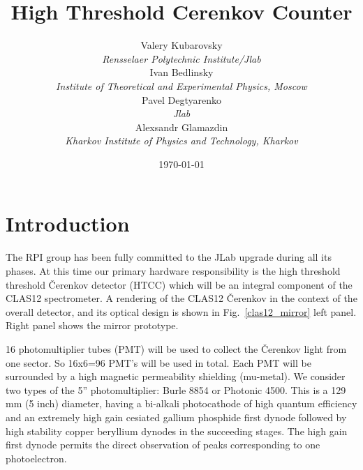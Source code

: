 \documentclass[11pt,titlepage]{article}
\begin{document}
\title{\textsf{High Threshold Cerenkov Counter}}
\author{Valery Kubarovsky\\
{\it \small Rensselaer Polytechnic Institute/Jlab}\\
Ivan Bedlinsky\\
{\it \small Institute of Theoretical and Experimental Physics, Moscow}\\
Pavel Degtyarenko\\
{\it \small Jlab}\\
Alexsandr Glamazdin\\
{\it \small Kharkov Institute of Physics and Technology, Kharkov}}
\date{\today }
\maketitle
\clearpage

\section{Introduction}

 The RPI group has been  fully 
committed to the JLab upgrade during  all its phases. At this time our primary hardware 
responsibility is the high threshold threshold \v Cerenkov detector (HTCC) which will 
be an integral component of the CLAS12 spectrometer. A rendering of the CLAS12 \v Cerenkov  
in the context of the overall detector, and its optical design  is shown in Fig.~\ref{clas12_mirror}
left panel.
Right panel shows the mirror prototype.

16 photomultiplier tubes (PMT) will be used to collect the \v Cerenkov light from one sector.
So  16x6=96 PMT's will be used in total.
Each PMT will be  surrounded by a high magnetic permeability shielding (mu-metal). 
We consider two types of the 5'' photomultiplier: Burle 8854 or Photonic 4500.
This is a 129 mm (5 inch) diameter, 
having a bi-alkali photocathode of high quantum 
efficiency and an extremely high gain cesiated gallium phosphide first dynode followed 
by high stability copper beryllium dynodes in the succeeding stages. 
The high gain first dynode permits the direct observation of peaks corresponding to one 
photoelectron.
\end{document}
